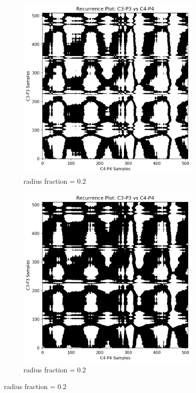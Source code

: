 \documentclass{article}
\begin{document}
\begin{figure}[htbp]
				    \vspace{0.5cm} %

				    \begin{subfigure}[t]{0.45\textwidth}
					\centering
					\includegraphics[width=\textwidth]{rr_compare/r02_epil.png}
					\caption{radius fraction = 0.2}
					\label{subfig:rp3}
				    \end{subfigure}
				    \hfill
				    \begin{subfigure}[t]{0.45\textwidth}
					\centering
					\includegraphics[width=\textwidth]{rr_compare/r03_epil.png}
					\caption{radius fraction = 0.2}
					\label{subfig:rp4}
				    \end{subfigure}


\end{figure}
\end{document}
